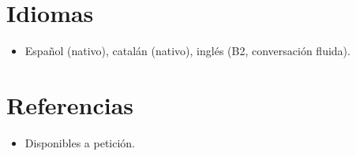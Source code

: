 \documentclass[11pt,a4paper,sans]{moderncv}
\begin{document}

\section{Idiomas}
\vspace{1pt}
\begin{itemize}
\item Español (nativo), catalán (nativo), inglés (B2, conversación fluida).
\end{itemize}


\section{Referencias}
\vspace{1pt}
\begin{itemize}
\item{Disponibles a petición.}
\end{itemize}
\end{document}
